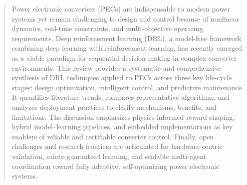 \begin{abstract}
Power electronic converters (PECs) are indispensable to modern power systems yet remain challenging to design and control because of nonlinear dynamics, real-time constraints, and multi-objective operating requirements. 
Deep reinforcement learning (DRL), a model-free framework combining deep learning with reinforcement learning, has recently emerged as a viable paradigm for sequential decision-making in complex converter environments. 
This review provides a systematic and comprehensive synthesis of DRL techniques applied to PECs across three key life-cycle stages: design optimization, intelligent control, and predictive maintenance. 
It quantifies literature trends, compares representative algorithms, and analyzes deployment practices to clarify mechanisms, benefits, and limitations. 
The discussion emphasizes physics-informed reward shaping, hybrid model–learning pipelines, and embedded implementations as key enablers of reliable and certifiable converter control. 
Finally, open challenges and research frontiers are articulated for hardware-centric validation, safety-guaranteed learning, and scalable multi-agent coordination toward fully adaptive, self-optimizing power electronic systems.

\end{abstract}
